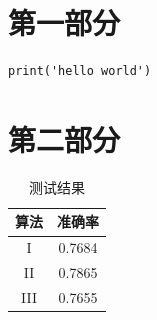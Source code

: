 \documentclass[a4paper,12pt]{report}
\begin{document}
\begin{appendix}

\chapter{第一部分}

\begin{verbatim}
print('hello world')
\end{verbatim}

\chapter{第二部分}

\begin{table}[htbp]
    \centering
    \caption{测试结果}
    \label{tab:my-table}
    \begin{tabular}{@{}cc@{}}
    \toprule
    算法 & 准确率 \\ \midrule
    I & 0.7684 \\
    II & 0.7865 \\
    III & 0.7655 \\ \bottomrule
    \end{tabular}
\end{table}

\end{appendix}
\end{document}
